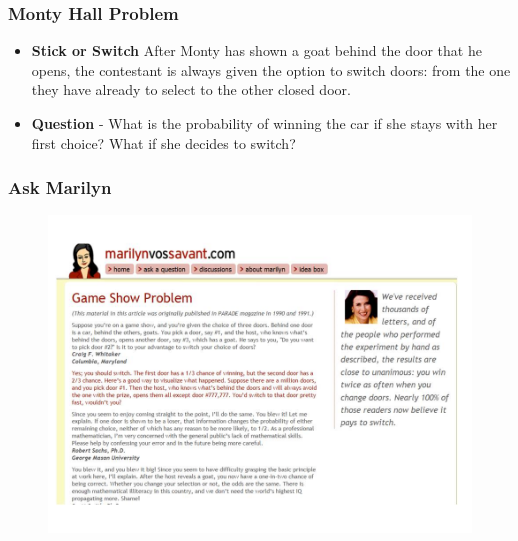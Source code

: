 \documentclass{beamer}
\begin{document}
\begin{frame}
	\frametitle{Monty Hall Problem}\LARGE
	\begin{itemize}
		\item \textbf{Stick or Switch}
	After Monty has shown a goat behind the door that he opens, the contestant is always given the option to switch doors: from the one they have already to select to the other closed door. 
	\item \textbf{Question} -  What is the probability of winning the car if she stays with her first choice? What if she decides to switch?
	\end{itemize}
\end{frame}

\begin{frame}
	\frametitle{Ask Marilyn}
	\begin{figure}
		\centering
		\includegraphics[width=1.17\linewidth]{MontyHall/Slide3}

	\end{figure}
	
\end{frame}
\end{document}
